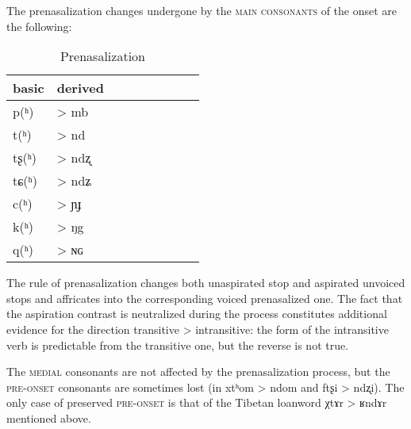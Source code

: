 \documentclass[oldfontcommands,oneside,a4paper,11pt]{article}
\newcommand{\ipa}[1]{{\phon \mbox{#1}}} %
\begin{document}
The prenasalization changes undergone by the \textsc{main consonants} of the onset are the following:
\begin{table}[H] \centering
\caption{Prenasalization} 
\begin{tabular}{lllllllll} \toprule 
basic    &  derived    &\\
\midrule
p(ʰ) & > mb\\
t(ʰ) & > nd\\
tʂ(ʰ) & > ndʐ\\
tɕ(ʰ) & > ndʑ\\
c(ʰ) & > ɲɟ\\
k(ʰ) & > ŋg\\
q(ʰ) & > ɴɢ \\
 \bottomrule
\end{tabular}
\end{table}

The rule of prenasalization changes both unaspirated stop and aspirated unvoiced stops and affricates into the corresponding voiced prenasalized one. The fact that the aspiration contrast is neutralized during the process constitutes additional evidence for the direction transitive > intransitive: the form of the intransitive verb is predictable from the transitive one, but the reverse is not true. 

The \textsc{medial} consonants are not affected by the prenasalization process, but the \textsc{pre-onset} consonants are sometimes lost (in \ipa{xtʰom} > \ipa{ndom} and \ipa{ftʂi} > \ipa{ndʐi}). The only case of preserved \textsc{pre-onset} is that of the Tibetan loanword \ipa{χtɤr} > \ipa{ʁndɤr} mentioned above.





 
\end{document}
